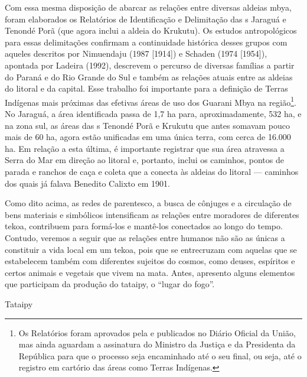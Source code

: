 Com essa mesma disposição de abarcar as relações entre diversas aldeias
mbya, foram elaborados os Relatórios de Identificação e Delimitação das
s Jaraguá e Tenondé Porã (que agora inclui a aldeia do Krukutu). Os
estudos antropológicos para essas delimitações confirmam a continuidade
histórica desses grupos com aqueles descritos por Nimuendaju (1987
[1914]) e Schaden (1974 [1954]), apontada por Ladeira (1992), descrevem
o percurso de diversas famílias a partir do Paraná e do Rio Grande do
Sul e também as relações atuais entre as aldeias do litoral e da
capital. Esse trabalho foi importante para a definição de Terras
Indígenas mais próximas das efetivas áreas de uso dos Guarani Mbya na
região\footnote{Os Relatórios foram aprovados pela  e publicados
no Diário Oficial da União, mas ainda aguardam a assinatura do Ministro
da Justiça e da Presidenta da República para que o processo seja
encaminhado até o seu final, ou seja, até o registro em cartório das
áreas como Terras Indígenas.}. No Jaraguá, a área identificada passa de
1,7 ha para, aproximadamente, 532 ha, e na zona sul, as áreas das s
Tenondé Porã e Krukutu que antes somavam pouco mais de 60 ha, agora
estão unificadas em uma única terra, com cerca de 16.000 ha. Em relação
a esta última, é importante registrar que sua área atravessa a Serra do
Mar em direção ao litoral e, portanto, inclui os caminhos, pontos de
parada e ranchos de caça e coleta que a conecta às aldeias do litoral ---
caminhos dos quais já falava Benedito Calixto em 1901.

Como dito acima, as redes de parentesco, a busca de cônjuges e a
circulação de bens materiais e simbólicos intensificam as relações
entre moradores de diferentes tekoa, contribuem para formá-los e
mantê-los conectados ao longo do tempo. Contudo, veremos a seguir que
as relações entre humanos não são as únicas a constituir a vida local
em um tekoa, pois que se entrecruzam com aquelas que se estabelecem
também com diferentes sujeitos do cosmos, como deuses, espíritos e
certos animais e vegetais que vivem na mata. Antes, apresento alguns
elementos que participam da produção do tataipy, o ``lugar do fogo''.

Tataipy

